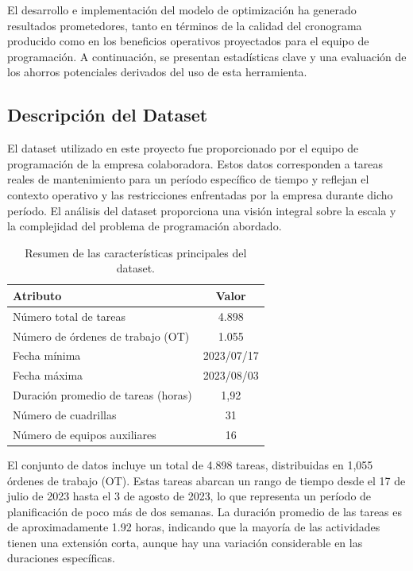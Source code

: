 \documentclass{article}
\begin{document}
El desarrollo e implementación del modelo de optimización ha generado resultados prometedores, tanto en términos de la calidad del cronograma producido como en los beneficios operativos proyectados para el equipo de programación. A continuación, se presentan estadísticas clave y una evaluación de los ahorros potenciales derivados del uso de esta herramienta.


\subsection{Descripción del Dataset}

El dataset utilizado en este proyecto fue proporcionado por el equipo de programación de la empresa colaboradora. Estos datos corresponden a tareas reales de mantenimiento para un período específico de tiempo y reflejan el contexto operativo y las restricciones enfrentadas por la empresa durante dicho período. El análisis del dataset proporciona una visión integral sobre la escala y la complejidad del problema de programación abordado.

\begin{table}[htbp]
    \centering
    \begin{tabular}{lc}
        \toprule
        \textbf{Atributo} & \textbf{Valor} \\
        \midrule
        Número total de tareas & 4.898 \\
        Número de órdenes de trabajo (OT) & 1.055 \\
        Fecha mínima & 2023/07/17 \\
        Fecha máxima & 2023/08/03 \\
        Duración promedio de tareas (horas) & 1,92 \\
        Número de cuadrillas & 31 \\
        Número de equipos auxiliares & 16 \\
        \bottomrule
    \end{tabular}
    \caption{Resumen de las características principales del dataset.}
    \label{tab:dataset_summary}
\end{table}


El conjunto de datos incluye un total de 4.898 tareas, distribuidas en 1,055 órdenes de trabajo (OT). Estas tareas abarcan un rango de tiempo desde el 17 de julio de 2023 hasta el 3 de agosto de 2023, lo que representa un período de planificación de poco más de dos semanas. La duración promedio de las tareas es de aproximadamente 1.92 horas, indicando que la mayoría de las actividades tienen una extensión corta, aunque hay una variación considerable en las duraciones específicas.
\end{document}
